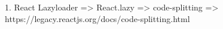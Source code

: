 1. React Lazyloader 
   => React.lazy 
   => code-splitting 
   => https://legacy.reactjs.org/docs/code-splitting.html